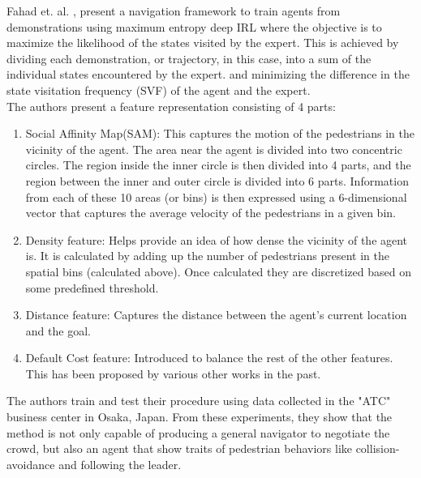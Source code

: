 Fahad et. al. \cite{fahad_learning_2018}, present a navigation framework to train agents from demonstrations using maximum entropy deep IRL where the objective is to maximize the likelihood of the states visited by the expert.
This is achieved by dividing each demonstration, or trajectory, in this case, into a sum of the individual states encountered by the expert. and minimizing the difference in the state visitation frequency (SVF) of the agent and the expert.\\
The authors present a feature representation consisting of 4 parts:
\begin{enumerate}
    \item Social Affinity Map(SAM): This captures the motion of the pedestrians in the vicinity of the agent. The area near the agent is divided into two concentric circles. The region inside the inner circle is then divided into 4 parts, and the region between the inner and outer circle is divided into 6 parts.
    Information from each of these 10 areas (or bins) is then expressed using a 6-dimensional vector that captures the average velocity of the pedestrians in a given bin. 
    \item Density feature: Helps provide an idea of how dense the vicinity of the agent is. It is calculated by adding up the number of pedestrians present in the spatial bins (calculated above). Once calculated they are discretized based on some predefined threshold.
    \item Distance feature: Captures the distance between the agent's current location and the goal.
    \item Default Cost feature: Introduced to balance the rest of the other features. This has been proposed by various other works in the past.
    
\end{enumerate}
The authors train and test their procedure using data collected in the "ATC" business center in Osaka, Japan.
From these experiments, they show that the method is not only capable of producing a general navigator to negotiate the crowd, but also an agent that show traits of pedestrian behaviors like collision-avoidance and following the leader.


